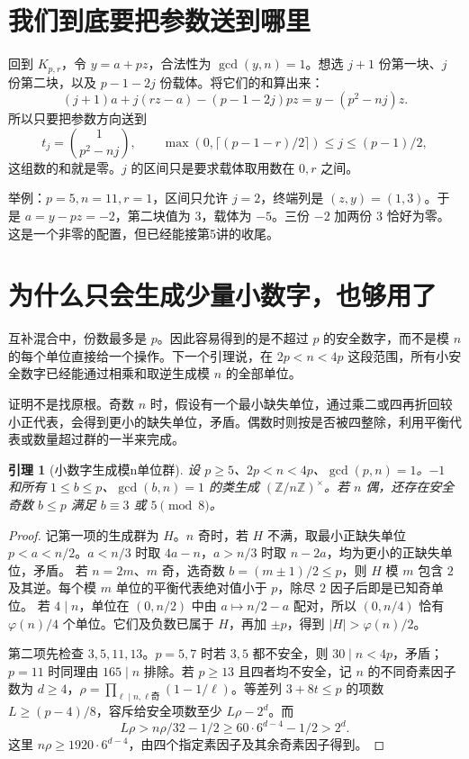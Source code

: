 \documentclass[11pt,a4paper,oneside,openany]{book}
\newcommand{\Z}{\mathbb Z}
\newtheorem{lemma}[theorem]{引理}
\theoremstyle{definition}
\numberwithin{equation}{chapter}
\begin{document}
\section{我们到底要把参数送到哪里}
回到 $K_{p,r}$，令 $y=a+pz$，合法性为 $\gcd(y,n)=1$。想选 $j+1$ 份第一块、$j$ 份第二块，以及 $p-1-2j$ 份载体。将它们的和算出来：
\[
(j+1)a+j(rz-a)-(p-1-2j)pz=y-(p^2-nj)z.
\]
所以只要把参数方向送到
\begin{equation}\label{eq:terminal}
t_j=\binom{1}{p^2-nj},\qquad
\max(0,\lceil(p-1-r)/2\rceil)\le j\le(p-1)/2,
\end{equation}
这组数的和就是零。$j$ 的区间只是要求载体取用数在 $0,r$ 之间。

举例：$p=5,n=11,r=1$，区间只允许 $j=2$，终端列是 $(z,y)=(1,3)$。于是 $a=y-pz=-2$，第二块值为 $3$，载体为 $-5$。三份 $-2$ 加两份 $3$ 恰好为零。这是一个非零的配置，但已经能接第5讲的收尾。

\section{为什么只会生成少量小数字，也够用了}
互补混合中，份数最多是 $p$。因此容易得到的是不超过 $p$ 的安全数字，而不是模 $n$ 的每个单位直接给一个操作。下一个引理说，在 $2p<n<4p$ 这段范围，所有小安全数字已经能通过相乘和取逆生成模 $n$ 的全部单位。

证明不是找原根。奇数 $n$ 时，假设有一个最小缺失单位，通过乘二或四再折回较小正代表，会得到更小的缺失单位，矛盾。偶数时则按是否被四整除，利用平衡代表或数量超过群的一半来完成。
\begin{lemma}[小数字生成模n单位群]\label{lem:small-units}
设 $p\ge5$、$2p<n<4p$、$\gcd(p,n)=1$。$-1$ 和所有 $1\le b\le p$、$\gcd(b,n)=1$ 的类生成 $(\Z/n\Z)^\times$。若 $n$ 偶，还存在安全奇数 $b\le p$ 满足 $b\equiv3$ 或 $5\pmod8$。
\end{lemma}
\begin{proof}
记第一项的生成群为 $H$。$n$ 奇时，若 $H$ 不满，取最小正缺失单位 $p<a<n/2$。$a<n/3$ 时取 $4a-n$，$a>n/3$ 时取 $n-2a$，均为更小的正缺失单位，矛盾。
若 $n=2m$、$m$ 奇，选奇数 $b=(m\pm1)/2\le p$，则 $H$ 模 $m$ 包含 $2$ 及其逆。每个模 $m$ 单位的平衡代表绝对值小于 $p$，除尽 $2$ 因子后即是已知奇单位。
若 $4\mid n$，单位在 $(0,n/2)$ 中由 $a\mapsto n/2-a$ 配对，所以 $(0,n/4)$ 恰有 $\varphi(n)/4$ 个单位。它们及负数已属于 $H$，再加 $\pm p$，得到 $|H|>\varphi(n)/2$。

第二项先检查 $3,5,11,13$。$p=5,7$ 时若 $3,5$ 都不安全，则 $30\mid n<4p$，矛盾；$p=11$ 时同理由 $165\mid n$ 排除。若 $p\ge13$ 且四者均不安全，记 $n$ 的不同奇素因子数为 $d\ge4$，$\rho=\prod_{\ell\mid n,\ell\text{奇}}(1-1/\ell)$。等差列 $3+8t\le p$ 的项数 $L\ge(p-4)/8$，容斥给安全项数至少 $L\rho-2^d$。而
\[
L\rho>n\rho/32-1/2\ge60\cdot6^{d-4}-1/2>2^d.
\]
这里 $n\rho\ge1920\cdot6^{d-4}$，由四个指定素因子及其余奇素因子得到。
\end{proof}
\end{document}
